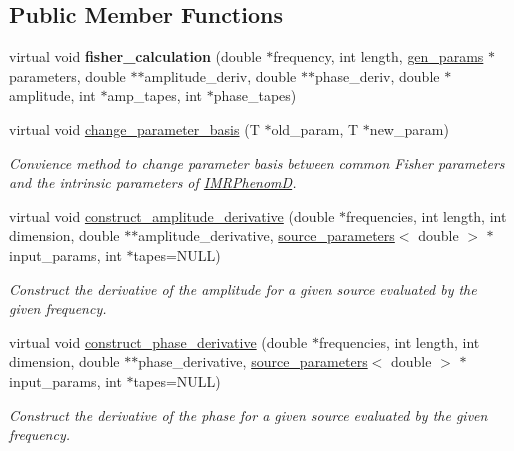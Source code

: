 \subsection*{Public Member Functions}
\begin{DoxyCompactItemize}
\item 
\mbox{\label{classIMRPhenomD_a860ba036ca87aa0692765bc80890baca}} 
virtual void {\bfseries fisher\+\_\+calculation} (double $\ast$frequency, int length, \hyperlink{structgen__params}{gen\+\_\+params} $\ast$parameters, double $\ast$$\ast$amplitude\+\_\+deriv, double $\ast$$\ast$phase\+\_\+deriv, double $\ast$amplitude, int $\ast$amp\+\_\+tapes, int $\ast$phase\+\_\+tapes)
\item 
virtual void \hyperlink{classIMRPhenomD_aafa87cba651e3f25e3dc27474864350a}{change\+\_\+parameter\+\_\+basis} (T $\ast$old\+\_\+param, T $\ast$new\+\_\+param)
\begin{DoxyCompactList}\small\item\em Convience method to change parameter basis between common Fisher parameters and the intrinsic parameters of \hyperlink{classIMRPhenomD}{I\+M\+R\+PhenomD}. \end{DoxyCompactList}\item 
virtual void \hyperlink{classIMRPhenomD_a4142331cc7a6471d13274b1ac8727378}{construct\+\_\+amplitude\+\_\+derivative} (double $\ast$frequencies, int length, int dimension, double $\ast$$\ast$amplitude\+\_\+derivative, \hyperlink{structsource__parameters}{source\+\_\+parameters}$<$ double $>$ $\ast$input\+\_\+params, int $\ast$tapes=N\+U\+LL)
\begin{DoxyCompactList}\small\item\em Construct the derivative of the amplitude for a given source evaluated by the given frequency. \end{DoxyCompactList}\item 
virtual void \hyperlink{classIMRPhenomD_a26da276caf4c148016f558541d6914f6}{construct\+\_\+phase\+\_\+derivative} (double $\ast$frequencies, int length, int dimension, double $\ast$$\ast$phase\+\_\+derivative, \hyperlink{structsource__parameters}{source\+\_\+parameters}$<$ double $>$ $\ast$input\+\_\+params, int $\ast$tapes=N\+U\+LL)
\begin{DoxyCompactList}\small\item\em Construct the derivative of the phase for a given source evaluated by the given frequency. \end{DoxyCompactList}\item 

\end{DoxyCompactItemize}
